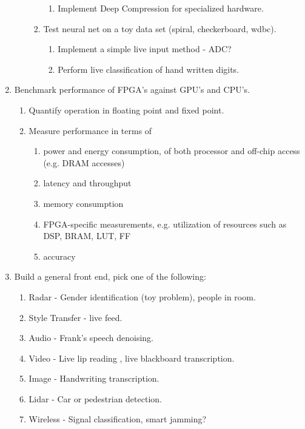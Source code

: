 \documentclass[12pt]{article}
\begin{document}
\begin{enumerate}
\begin{enumerate}
\begin{enumerate}
\begin{enumerate}
            \item Implement Deep Compression for specialized hardware. \cite{DBLP:journals/corr/HanMD15}
          \end{enumerate}
        \item Test neural net on a toy data set (spiral, checkerboard, wdbc).\
          \begin{enumerate}
            \item Implement a simple live input method - ADC?
            \item Perform live classification of hand written digits.
          \end{enumerate}
      \end{enumerate}
    \end{enumerate}
  \item Benchmark performance of FPGA's against GPU's and CPU's.
    \begin{enumerate}
      \item Quantify operation in floating point and fixed point.
      \item Measure performance in terms of 
          \begin{enumerate}
              \item power and energy consumption, of both processor and off-chip access (e.g. DRAM accesses)
              \item latency and throughput
              \item memory consumption
              \item FPGA-specific measurements, e.g. utilization of resources such as DSP, BRAM,  LUT, FF
              \item accuracy
          \end{enumerate}
    \end{enumerate}
  \item Build a general front end, pick one of the following:
    \begin{enumerate}
      \item Radar - Gender identification (toy problem), people in room.
      \item Style Transfer - live feed.
      \item Audio - Frank's speech denoising.
      \item Video - Live lip reading \cite{DBLP:journals/corr/AssaelSWF16}, live blackboard transcription.
      \item Image - Handwriting transcription.
      \item Lidar - Car or pedestrian detection.
      \item Wireless - Signal classification, smart jamming?
    \end{enumerate}
  \end{enumerate}
  


\end{document}
